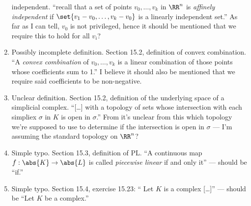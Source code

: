 \documentclass{fkletter}
\begin{document}
\begin{enumerate}
    independent. ``recall that a set of points $v_0, \ldots, v_k$ in $\RR^n$ is
    \emph{affinely independent} if $\set{v_1 - v_0, \ldots, v_k - v_0}$ is a
    linearly independent set.'' {\color{red} As far as I can tell, $v_0$ is not
      privileged, hence it should be mentioned that we require this to hold for
      all $v_i$?}
  \item Possibly incomplete definition. Section 15.2, definition of convex
    combination. ``A \emph{convex combination} of $v_0, \ldots, v_k$ is a linear
    combination of those points whose coefficients sum to 1.'' {\color{red} I
      believe it should also be mentioned that we require said coefficients to
      be non-negative.}
  \item Unclear definition. Section 15.2, definition of the underlying space of
    a simplicial complex. ``[\ldots] with a topology of sets whose intersection
    with each simpliex $\sigma$ in $K$ is {\color{red} open in $\sigma$}.'' From
    it's unclear from this which topology we're supposed to use to determine if
    the intersection is open in $\sigma$ --- I'm assuming the standard topology
    on $\RR^n$?
  \item Simple typo. Section 15.3, definition of PL. ``A continuous map $f :
    \abs{K} \to \abs{L}$ is called \emph{piecewise linear} if and only
    {\color{red} it}'' --- should be ``if.''
  \item Simple typo. Section 15.4, exercise 15.23: ``{\color{red} Let $K$ is a
      complex} [\ldots]'' --- should be ``Let $K$ be a complex.''
\end{enumerate}
\end{document}
